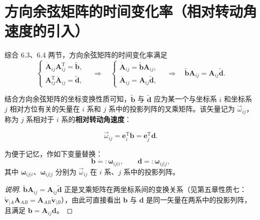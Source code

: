 \section{方向余弦矩阵的时间变化率（相对转动角速度的引入）}
综合 6.3、6.4 两节，方向余弦矩阵的时间变化率满足
\[
\begin{cases}
\dot{\boldsymbol{A}}_{ij}\boldsymbol{A}_{ij}^{\mathrm{T}}=\tilde{\boldsymbol{b}},\\
\boldsymbol{A}_{ij}^{\mathrm{T}}\dot{\boldsymbol{A}}_{ij}=\tilde{\boldsymbol{d}},
\end{cases}
\quad\Longrightarrow\quad
\begin{cases}
\dot{\boldsymbol{A}}_{ij}=\tilde{\boldsymbol{b}}\boldsymbol{A}_{ij},\\
\dot{\boldsymbol{A}}_{ij}=\boldsymbol{A}_{ij}\tilde{\boldsymbol{d}},
\end{cases}
\quad\Longrightarrow\quad
\tilde{\boldsymbol{b}}\boldsymbol{A}_{ij}=\boldsymbol{A}_{ij}\tilde{\boldsymbol{d}}.
\]
\begin{theorem}[相对转动角速度]
结合方向余弦矩阵的坐标变换性质可知，$\tilde{\boldsymbol{b}}$ 与 $\tilde{\boldsymbol{d}}$ 应为某一个与坐标系 $i$ 和坐标系 $j$ 相对方位有关的矢量在 $i$ 系和 $j$ 系中的投影列阵的叉乘矩阵。该矢量记为 $\vec{\omega}_{ij}$，称为 $j$ 系相对于 $i$ 系的\textbf{相对转动角速度}：

\[
\vec{\omega}_{ij}=\boldsymbol{e}_i^{\mathrm{T}}\boldsymbol{b}=\boldsymbol{e}_j^{\mathrm{T}}\boldsymbol{d}.
\]
\end{theorem}
为便于记忆，作如下变量替换：
\[
\boldsymbol{b}=:\boldsymbol{\omega}_{ij|i},\qquad \boldsymbol{d}=:\boldsymbol{\omega}_{ij|j},
\]
其中 $\boldsymbol{\omega}_{ij|i}$、$\boldsymbol{\omega}_{ij|j}$ 分别为 $\vec{\omega}_{ij}$ 在 $i$ 系、$j$ 系中的投影列阵。
\begin{proof}[说明]
$\tilde{\boldsymbol{b}}\boldsymbol{A}_{ij}=\boldsymbol{A}_{ij}\tilde{\boldsymbol{d}}$ 正是叉乘矩阵在两坐标系间的变换关系（见第五章性质七：$\tilde{\boldsymbol{v}}_{|A}\boldsymbol{A}_{AB}=\boldsymbol{A}_{AB}\tilde{\boldsymbol{v}}_{|B}$），由此可直接看出 $\boldsymbol{b}$ 与 $\boldsymbol{d}$ 是同一矢量在两系中的投影列阵，且满足 $\boldsymbol{b}=\boldsymbol{A}_{ij}\boldsymbol{d}$。
\end{proof}
